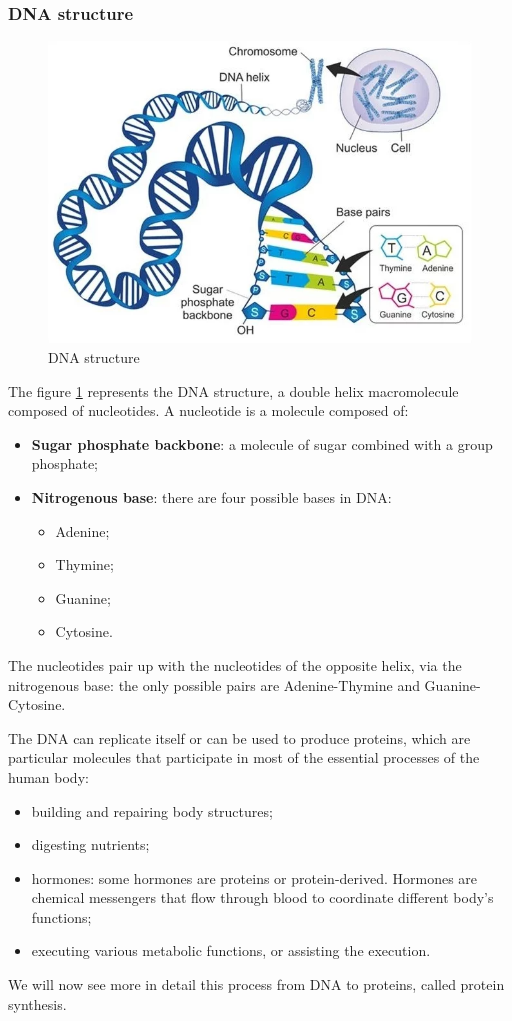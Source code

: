 \subsubsection{DNA structure}

\begin{figure}[h!]
	\includegraphics[scale=.6]{res/proteins_overview/dna_basepairs.png}
	\centering
	\caption{DNA structure}
	\label{fig:dna-structure}
\end{figure}

The figure \ref{fig:dna-structure} represents the DNA structure, a double helix macromolecule composed of nucleotides. A nucleotide is a molecule composed of:
\begin{itemize}
	\item \textbf{Sugar phosphate backbone}: a molecule of sugar combined with a group phosphate;
	\item \textbf{Nitrogenous base}: there are four possible bases in DNA:
	\begin{itemize}
		\item Adenine;
		\item Thymine;
		\item Guanine;
		\item Cytosine.
	\end{itemize}
\end{itemize}
The nucleotides pair up with the nucleotides of the opposite helix, via the nitrogenous base: the only possible pairs are Adenine-Thymine and Guanine-Cytosine.

\pagebreak

The DNA can replicate itself or can be used to produce proteins, which are particular molecules that participate in most of the essential processes of the human body:
\begin{itemize}
	\item building and repairing body structures;
	\item digesting nutrients;
	\item hormones: some hormones are proteins or protein-derived. Hormones are chemical messengers that flow through blood to coordinate different body's functions;
	\item executing various metabolic functions, or assisting the execution.
\end{itemize}
We will now see more in detail this process from DNA to proteins, called protein synthesis.

